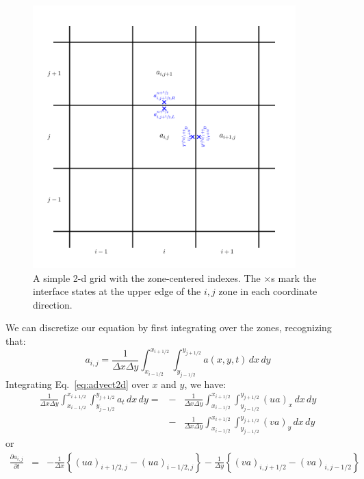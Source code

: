 \begin{figure}[h]
\centering
\includegraphics[width=4.0in]{2dgrid}
\caption[A 2-d grid with zone-centered indexes.]{\label{fig:2dgrid} A
  simple 2-d grid with the zone-centered indexes.  The $\times$s mark
  the interface states at the upper edge of the $i,j$ zone in each
  coordinate direction.}
\end{figure}

We can discretize our equation by first integrating over the zones, 
recognizing that:
\begin{equation}
a_{i,j} = \frac{1}{\Delta x \Delta y} 
   \int_{x_{i-1/2}}^{x_{i+1/2}} \int_{y_{j-1/2}}^{y_{j+1/2}} 
   a(x,y,t) \, dx \, dy
\end{equation}
Integrating Eq.~\ref{eq:advect2d} over $x$ and $y$, we have:
\begin{eqnarray}
\frac{1}{\Delta x \Delta y} 
  \int_{x_{i-1/2}}^{x_{i+1/2}} 
  \int_{y_{j-1/2}}^{y_{j+1/2}} a_t \, dx \, dy =  
  &-& \frac{1}{\Delta x \Delta y}
       \int_{x_{i-1/2}}^{x_{i+1/2}} \int_{y_{j-1/2}}^{y_{j+1/2}}
      (u a)_x \, dx \, dy \nonumber \\
  &-& \frac{1}{\Delta x \Delta y}
       \int_{x_{i-1/2}}^{x_{i+1/2}} \int_{y_{j-1/2}}^{y_{j+1/2}}
      (v a)_y \, dx \, dy 
\end{eqnarray}
or
\begin{eqnarray}
 \frac{\partial a_{i,j}}{\partial t} &=&
  - \frac{1}{\Delta x} \left \{ (u a)_{i+1/2,j} - (u a)_{i-1/2,j} \right \}
  - \frac{1}{\Delta y} \left \{ (v a)_{i,j+1/2} - (v a)_{i,j-1/2} \right \}
\end{eqnarray}

